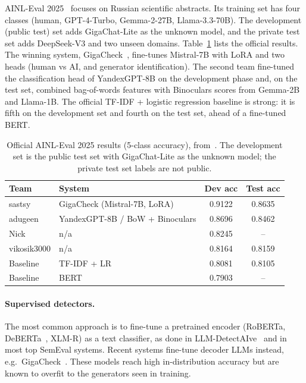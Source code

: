 \documentclass{article}
\begin{document}
AINL-Eval 2025~\cite{ainleval2025} focuses on Russian scientific abstracts. Its training set has four classes (human, GPT-4-Turbo, Gemma-2-27B, Llama-3.3-70B). The development (public test) set adds GigaChat-Lite as the unknown model, and the private test set adds DeepSeek-V3 and two unseen domains. Table~\ref{tab:leaderboard} lists the official results. The winning system, GigaCheck~\cite{gigacheck}, fine-tunes Mistral-7B with LoRA and two heads (human vs AI, and generator identification). The second team fine-tuned the classification head of YandexGPT-8B on the development phase and, on the test set, combined bag-of-words features with Binoculars scores from Gemma-2B and Llama-1B. The official TF-IDF + logistic regression baseline is strong: it is fifth on the development set and fourth on the test set, ahead of a fine-tuned BERT.

\begin{table}[tbh!]
\begin{center}
\small
\begin{tabular}{|l|l|cc|}
\hline
Team & System & Dev acc & Test acc \\
\hline
sastsy & GigaCheck (Mistral-7B, LoRA) & 0.9122 & 0.8635 \\
adugeen & YandexGPT-8B / BoW + Binoculars & 0.8696 & 0.8462 \\
Nick & n/a & 0.8245 & -- \\
vikosik3000 & n/a & 0.8164 & 0.8159 \\
Baseline & TF-IDF + LR & 0.8081 & 0.8105 \\
Baseline & BERT & 0.7903 & -- \\
\hline
\end{tabular}
\caption{Official AINL-Eval 2025 results (5-class accuracy), from~\cite{ainleval2025}. The development set is the public test set with GigaChat-Lite as the unknown model; the private test set labels are not public.}
\label{tab:leaderboard}
\end{center}
\end{table}

\paragraph{Supervised detectors.}
The most common approach is to fine-tune a pretrained encoder (RoBERTa, DeBERTa~\cite{deberta3}, XLM-R) as a text classifier, as done in LLM-DetectAIve~\cite{llmdetectaive} and in most top SemEval systems. Recent systems fine-tune decoder LLMs instead, e.g.\ GigaCheck~\cite{gigacheck}. These models reach high in-distribution accuracy but are known to overfit to the generators seen in training.
\end{document}
